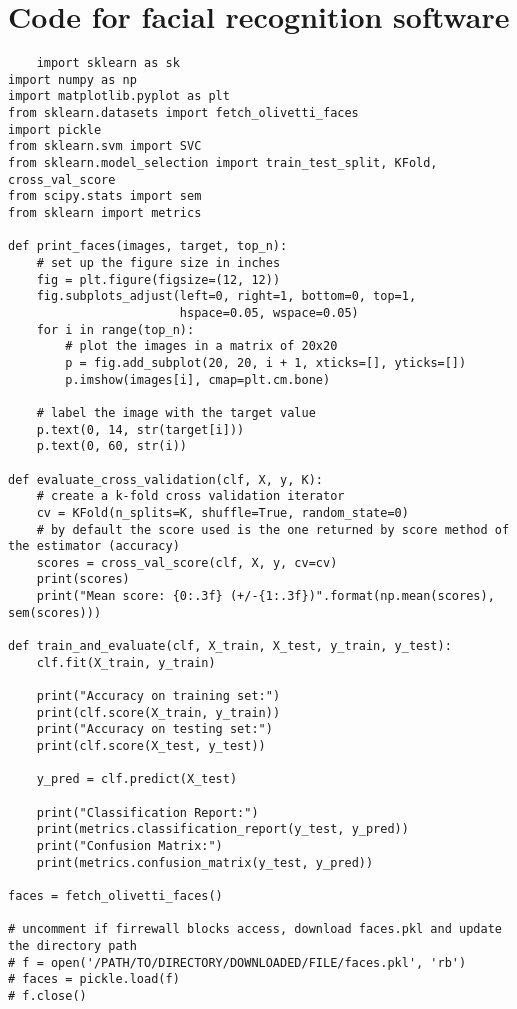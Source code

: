 \documentclass[12pt]{article}
\begin{document}
\section{Code for facial recognition software}
\begin{verbatim}
    import sklearn as sk
import numpy as np
import matplotlib.pyplot as plt
from sklearn.datasets import fetch_olivetti_faces
import pickle
from sklearn.svm import SVC
from sklearn.model_selection import train_test_split, KFold, cross_val_score
from scipy.stats import sem
from sklearn import metrics

def print_faces(images, target, top_n):
    # set up the figure size in inches
    fig = plt.figure(figsize=(12, 12))
    fig.subplots_adjust(left=0, right=1, bottom=0, top=1,
                        hspace=0.05, wspace=0.05)
    for i in range(top_n):
        # plot the images in a matrix of 20x20
        p = fig.add_subplot(20, 20, i + 1, xticks=[], yticks=[])
        p.imshow(images[i], cmap=plt.cm.bone)

    # label the image with the target value
    p.text(0, 14, str(target[i]))
    p.text(0, 60, str(i))

def evaluate_cross_validation(clf, X, y, K):
    # create a k-fold cross validation iterator
    cv = KFold(n_splits=K, shuffle=True, random_state=0)
    # by default the score used is the one returned by score method of the estimator (accuracy)
    scores = cross_val_score(clf, X, y, cv=cv)
    print(scores)
    print("Mean score: {0:.3f} (+/-{1:.3f})".format(np.mean(scores), sem(scores)))

def train_and_evaluate(clf, X_train, X_test, y_train, y_test):
    clf.fit(X_train, y_train)

    print("Accuracy on training set:")
    print(clf.score(X_train, y_train))
    print("Accuracy on testing set:")
    print(clf.score(X_test, y_test))

    y_pred = clf.predict(X_test)

    print("Classification Report:")
    print(metrics.classification_report(y_test, y_pred))
    print("Confusion Matrix:")
    print(metrics.confusion_matrix(y_test, y_pred))

faces = fetch_olivetti_faces()

# uncomment if firrewall blocks access, download faces.pkl and update the directory path
# f = open('/PATH/TO/DIRECTORY/DOWNLOADED/FILE/faces.pkl', 'rb')
# faces = pickle.load(f)
# f.close()
\end{verbatim}
\end{document}
